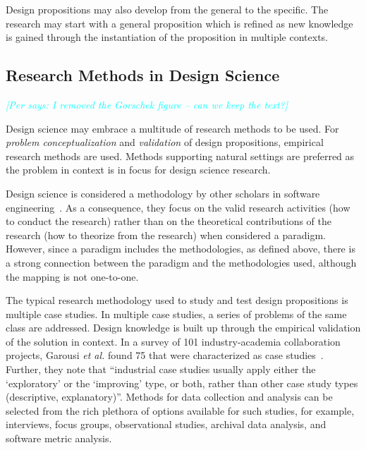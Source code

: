 \documentclass[graybox]{svmult}
\newcommand{\peggy}[1]{\textcolor{blue}{{\it [Peggy says: #1]}}}
\newcommand{\per}[1]{\textcolor{cyan}{{\it [Per says: #1]}}}
\newcommand{\peggy}[1]{}
\newcommand{\per}[1]{}
\begin{document}
Design propositions may also develop from the general to the specific. The research may start with a general proposition which is refined as new knowledge is gained through the instantiation of the proposition in multiple contexts. 


\subsection{Research Methods in Design Science} 
\per{I removed the Gorschek figure -- can we keep the text?}

Design science may embrace a multitude of research methods to be used. For \emph{problem conceptualization} and \emph{validation} of design propositions, empirical research methods are used. Methods supporting natural settings are preferred as the problem in context is in focus for design science research. 

Design science is considered a methodology by other scholars in software engineering~\cite{Wohlin2015}. As a consequence, they focus on the valid research activities (how to conduct the research) rather than on the theoretical contributions of the research (how to theorize from the research) when considered a paradigm. However, since a paradigm includes the methodologies, as defined above, there is a strong connection between the paradigm and the methodologies used, although the mapping is not one-to-one.


The typical research methodology used to study and test design propositions is multiple case studies. In multiple case studies, a series of problems of the same class are addressed. Design knowledge is built up through the empirical validation of the solution in context. 
In a survey of 101 industry-academia collaboration projects, Garousi \emph{et al.} found 75 that were characterized as case studies~\cite{Garousi2019}. Further, they note that ``industrial case studies usually apply either the `exploratory' or the `improving' type, or both, rather than other case study types (descriptive, explanatory)''. Methods for data collection and analysis can be selected from the rich plethora of options available for such studies, for example, interviews, focus groups, observational studies, archival data analysis, and software metric analysis. 
\end{document}
